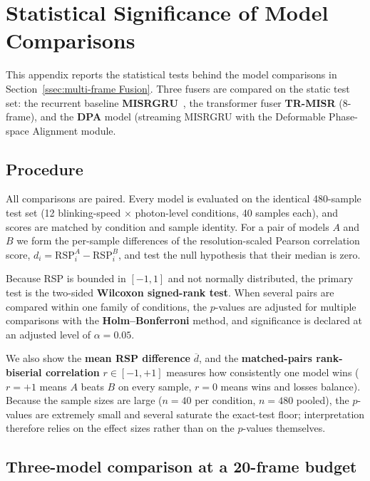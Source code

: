 \chapter{Statistical Significance of Model Comparisons}
\label{app:significance}

This appendix reports the statistical tests behind the model comparisons in
Section~\ref{ssec:multi-frame Fusion}. Three fusers are compared on the static
test set: the recurrent baseline \textbf{MISRGRU}~\cite{resurf2024}, the
transformer fuser \textbf{TR-MISR} (8-frame), and the
\textbf{DPA} model (streaming MISRGRU with the Deformable Phase-space Alignment
module.

\section*{Procedure}
\label{appsec:sig_method}

All comparisons are paired. Every model is evaluated on the identical
480-sample test set (12 blinking-speed $\times$ photon-level conditions,
40 samples each), and scores are matched by condition and sample identity. For a
pair of models $A$ and $B$ we form the per-sample differences of the
resolution-scaled Pearson correlation score, $d_i = \mathrm{RSP}^A_i - \mathrm{RSP}^B_i$, and
test the null hypothesis that their median is zero.

Because RSP is bounded in $[-1,1]$ and not normally distributed, the primary test
is the two-sided \textbf{Wilcoxon signed-rank test}. When several pairs are
compared within one family of conditions, the $p$-values are adjusted for
multiple comparisons with the \textbf{Holm--Bonferroni} method, and
significance is declared at an adjusted level of $\alpha = 0.05$.

We also show the \textbf{mean RSP difference}
$\overline{d}$, and
the \textbf{matched-pairs rank-biserial correlation} $r \in [-1, +1]$ measures how
consistently one model wins ($r = +1$ means $A$ beats $B$ on every sample,
$r = 0$ means wins and losses balance). Because the sample sizes are large
($n = 40$ per condition, $n = 480$ pooled), the $p$-values are extremely small and
several saturate the exact-test floor; interpretation therefore relies on the
effect sizes rather than on the $p$-values themselves.

\section*{Three-model comparison at a 20-frame budget}
\label{appsec:sig_20f}

